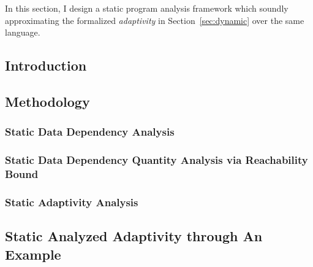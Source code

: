 In this section, I design a static program analysis framework which soundly approximating the formalized 
\emph{adaptivity} in Section~\ref{sec:dynamic} 
over the same language.
\subsection{Introduction}
\label{subsec:static-intro}


\subsection{Methodology}
\label{subsec:static-methodology}



\subsubsection{Static Data Dependency Analysis}
\label{subsubsec:static-datadep}


\subsubsection{Static Data Dependency Quantity Analysis via Reachability Bound}
\label{subsubsec:static-reachability}


\subsubsection{Static Adaptivity Analysis}
\label{subsubsec:static-adapt}


\subsection{Static Analyzed Adaptivity through An Example}
\label{subsec:static-examples}
% 

%
